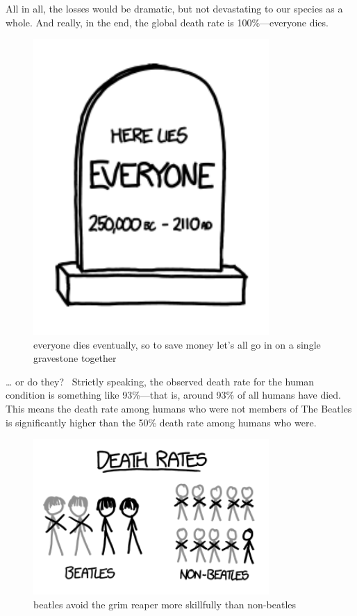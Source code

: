 {All in all, the losses would be dramatic, but not devastating to our species as a whole. And really, in the end, the global death rate is 100\%—everyone dies.}

\begin{figure}[!htbp]
\centering
\includegraphics[scale=0.5, max width=0.8\textwidth]{imgs/a/27/death_everyone.png}
\caption{everyone dies eventually, so to save money let's all go in on a single gravestone together}
\end{figure}

{… or do they?  Strictly speaking, the observed death rate for the human condition is something like 93\%—that is, around 93\% of all humans have died. This means the death rate among humans who were not members of The Beatles is significantly higher than the 50\% death rate among humans who were.}

\begin{figure}[!htbp]
\centering
\includegraphics[scale=0.5, max width=0.8\textwidth]{imgs/a/27/death_beatles.png}
\caption{beatles avoid the grim reaper more skillfully than non-beatles}
\end{figure}

